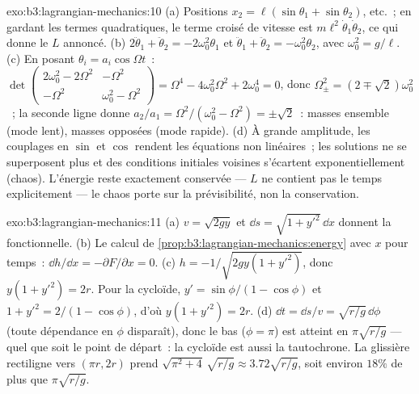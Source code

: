 \begin{solution}{exo:b3:lagrangian-mechanics:10}
(a) Positions $x_2 = \ell(\sin\theta_1 + \sin\theta_2)$, etc.~; en
gardant les termes quadratiques, le terme croisé de vitesse est
$m\ell^2\dot\theta_1\dot\theta_2$, ce qui donne le $L$ annoncé. (b)
$2\ddot\theta_1 + \ddot\theta_2 = -2\omega_0^2\theta_1$ et
$\ddot\theta_1 + \ddot\theta_2 = -\omega_0^2\theta_2$, avec $\omega_0^2
= g/\ell$. (c) En posant $\theta_i = a_i\cos\Omega t$~:
$\det\begin{pmatrix} 2\omega_0^2 - 2\Omega^2 & -\Omega^2\\ -\Omega^2 &
\omega_0^2 - \Omega^2\end{pmatrix} = \Omega^4 - 4\omega_0^2\Omega^2 +
2\omega_0^4 = 0$, donc $\Omega_\pm^2 = (2 \mp \sqrt2)\omega_0^2$~; la
seconde ligne donne $a_2/a_1 = \Omega^2/(\omega_0^2 - \Omega^2) =
\pm\sqrt2$~: masses ensemble (mode lent), masses opposées (mode rapide).
(d) À grande amplitude, les couplages en $\sin$ et $\cos$ rendent les
équations non linéaires~; les solutions ne se superposent plus et des
conditions initiales voisines s'écartent exponentiellement (chaos).
L'énergie reste exactement conservée --- $L$ ne contient pas le temps
explicitement --- le chaos porte sur la prévisibilité, non la conservation.
\end{solution}

\begin{solution}{exo:b3:lagrangian-mechanics:11}
(a) $v = \sqrt{2gy}$ et $\dd s = \sqrt{1 + y'^2}\,\dd x$ donnent la
fonctionnelle. (b) Le calcul de
\cref{prop:b3:lagrangian-mechanics:energy} avec $x$ pour temps~: $\dd
h/\dd x = -\partial F/\partial x = 0$. (c) $h = -1/\sqrt{2gy(1 +
y'^2)}$, donc $y(1 + y'^2) = 2r$. Pour la cycloïde, $y' =
\sin\phi/(1 - \cos\phi)$ et $1 + y'^2 = 2/(1 - \cos\phi)$, d'où
$y(1 + y'^2) = 2r$. (d) $\dd t = \dd s/v = \sqrt{r/g}\,\dd\phi$ (toute
dépendance en $\phi$ disparaît), donc le bas ($\phi = \pi$) est atteint en
$\pi\sqrt{r/g}$ --- quel que soit le point de départ~: la cycloïde est
aussi la tautochrone. La glissière rectiligne vers $(\pi r, 2r)$ prend $\sqrt{\pi^2
+ 4}\,\sqrt{r/g} \approx 3.72\sqrt{r/g}$, soit environ $18\%$ de plus que
$\pi\sqrt{r/g}$.
\end{solution}

